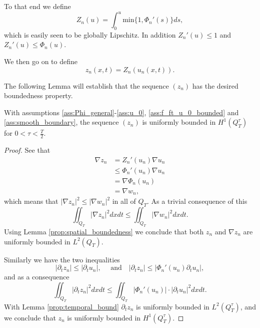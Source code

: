 \documentclass[11pt, a4paper]{article}
\begin{document}
To that end we define
\begin{equation}
Z_n(u) = \int_0^u \mathrm{min}\{1, \Phi_n'(s)\} ds,
\end{equation}
which is easily seen to be globally Lipschitz. In addition $Z_n'(u) \leq 1$ and $Z_n'(u) \leq \Phi_n(u)$.

We then go on to define
\begin{equation}
z_n(x,t) = Z_n(u_n(x,t)).
\end{equation}

The following Lemma will establish that the sequence $(z_n)$ has the desired boundedness property.

\begin{lemma}
\label{prop:z_n_bounded_H1}
With assumptions \ref{ass:Phi_general}-\ref{ass:u_0}, \ref{ass:f_ft_u_0_bounded} and \ref{ass:smooth_boundary}, the sequence $(z_n)$ is uniformly bounded in $H^1(Q_T^\tau)$ for $0<\tau < \frac{T}{2}$.
\end{lemma} 

\begin{proof}
See that
\begin{align*}
\nabla z_n &= Z_n'(u_n)\nabla u_n \\
	&\leq \Phi_n'(u_n)\nabla u_n \\
	&= \nabla \Phi_n(u_n) \\
	&= \nabla w_n,
\end{align*}
which means that $|\nabla z_n|^2 \leq |\nabla w_n|^2$ in all of $Q_T$. As a trivial consequence of this
\begin{equation*}
\iint_{Q_T}|\nabla z_n|^2dxdt \leq \iint_{Q_T}|\nabla w_n|^2dxdt.
\end{equation*}
Using Lemma \ref{prop:spatial_boundedness} we conclude that both $z_n$ and $\nabla z_n$ are uniformly bounded in $L^2(Q_T)$.

Similarly we have the two inequalities
\begin{equation*}
|\partial_t z_n | \leq |\partial_t u_n|, \quad \text{ and} \quad |\partial_t z_n| \leq |\Phi_n'(u_n) \partial_t u_n|,
\end{equation*}
and as a consequence
\begin{equation*}
\iint_{Q_T}|\partial_t z_n|^2 dxdt \leq \iint_{Q_T} |\Phi_n'(u_n)|\cdot |\partial_t u_n|^2dxdt.
\end{equation*}
With Lemma \ref{prop:temporal_bound} $\partial_t z_n$ is uniformly bounded in $L^2(Q_T^\tau)$, and we conclude that $z_n$ is uniformly bounded in $H^1(Q_T^\tau)$.
\end{proof}
\end{document}
